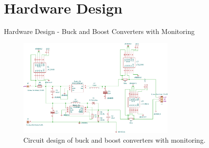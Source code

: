 \documentclass[aspectratio=169]{beamer}
\begin{document}
	\section{Hardware Design}
	\begin{frame}{Hardware Design - Buck and Boost Converters with Monitoring }
		\begin{figure}[h]
			\centering
			\includegraphics[width=0.7\textwidth]{diag/1.pdf}
			\caption{Circuit design of buck and boost converters with monitoring.}
			\label{fig:bubo}
		\end{figure}
	\end{frame}
\end{document}
